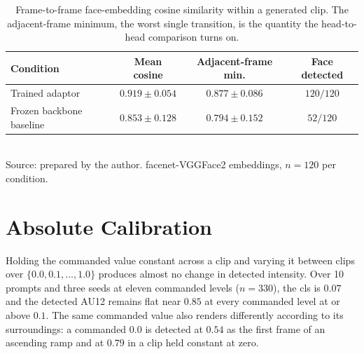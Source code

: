 \begin{table}[H]
    \centering
    \caption{Frame-to-frame face-embedding cosine similarity within a generated clip. The adjacent-frame minimum, the worst single transition, is the quantity the head-to-head comparison turns on.}
    \label{tab:res-identity}
    \begin{tabular}{@{}lccc@{}}
        \toprule
        Condition & Mean cosine & Adjacent-frame min. & Face detected \\
        \midrule
        Trained adaptor          & $0.919 \pm 0.054$ & $0.877 \pm 0.086$ & $120/120$ \\
        Frozen backbone baseline & $0.853 \pm 0.128$ & $0.794 \pm 0.152$ & $52/120$ \\
        \bottomrule
    \end{tabular}\\[4pt]
    {\footnotesize Source: prepared by the author. facenet-VGGFace2 embeddings, $n=120$ per condition.}
\end{table}

\section{Absolute Calibration}\label{sec:res-calibration}

%
%
%
%

Holding the commanded value constant across a clip and varying it between clips over
$\{0.0, 0.1, \dots, 1.0\}$ produces almost no change in detected intensity. Over 10 prompts and
three seeds at eleven commanded levels ($n=330$), the \gls{cls} is $0.07$ and the detected AU12
remains flat near $0.85$ at every commanded level at or above $0.1$. The same commanded value
also renders differently according to its surroundings: a commanded $0.0$ is detected at $0.54$
as the first frame of an ascending ramp and at $0.79$ in a clip held constant at zero.

